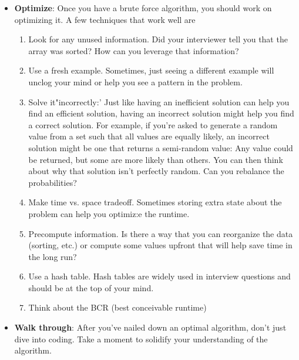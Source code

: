 \documentclass{report}
\begin{document}
\begin{itemize}
            \bigbreak \noindent 
            It's okay that this initial solution is terrible. Explain what the space and time complexity is, and then dive into improvements.
            \bigbreak \noindent 
            Despite being possibly slow, a brute force algorithm is valuable to discuss. It's a starting point for optimizations, and it helps you wrap your head around the problem.
        \item \textbf{Optimize}: Once you have a brute force algorithm, you should work on optimizing it. A few techniques that work well are
            \begin{enumerate}
                \item Look for any unused information. Did your interviewer tell you that the array was sorted? How can you leverage that information?
                \item Use a fresh example. Sometimes, just seeing a different example will unclog your mind or help you see a pattern in the problem.
                \item Solve it"incorrectly:' Just like having an inefficient solution can help you find an efficient solution, having an incorrect solution might help you find a correct solution. For example, if you're asked to generate a random value from a set such that all values are equally likely, an incorrect solution might be one that returns a semi-random value: Any value could be returned, but some are more likely than others. You can then think about why that solution isn't perfectly random. Can you rebalance the probabilities?
                \item Make time vs. space tradeoff. Sometimes storing extra state about the problem can help you optimiz:e the runtime.
                \item Precompute information. Is there a way that you can reorganize the data (sorting, etc.) or compute some values upfront that will help save time in the long run?
                \item Use a hash table. Hash tables are widely used in interview questions and should be at the top of your mind.
                \item Think about the BCR (best conceivable runtime)
            \end{enumerate}
        \item \textbf{Walk through}: After you've nailed down an optimal algorithm, don't just dive into coding. Take a moment to solidify your understanding of the algorithm.
            \bigbreak \noindent 

\end{itemize}
\end{document}
